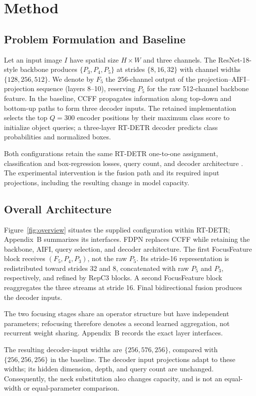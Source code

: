 \documentclass[journal]{IEEEtran}
\begin{document}
\section{Method}
\subsection{Problem Formulation and Baseline}
Let an input image $I$ have spatial size $H\times W$ and three channels. The ResNet-18-style backbone \cite{he2016resnet} produces $\{P_3,P_4,P_5\}$ at strides $\{8,16,32\}$ with channel widths $\{128,256,512\}$. We denote by $F_5$ the 256-channel output of the projection--AIFI--projection sequence (layers 8--10), reserving $P_5$ for the raw 512-channel backbone feature. In the baseline, CCFF propagates information along top-down and bottom-up paths to form three decoder inputs. The retained implementation selects the top $Q=300$ encoder positions by their maximum class score to initialize object queries; a three-layer RT-DETR decoder predicts class probabilities and normalized boxes.

Both configurations retain the same RT-DETR one-to-one assignment, classification and box-regression losses, query count, and decoder architecture \cite{carion2020detr,zhao2024rtdetr}. The experimental intervention is the fusion path and its required input projections, including the resulting change in model capacity.

\subsection{Overall Architecture}
Figure~\ref{fig:overview} situates the supplied configuration within RT-DETR; Appendix~B summarizes its interfaces. FDPN replaces CCFF while retaining the backbone, AIFI, query selection, and decoder architecture. The first FocusFeature block receives $(F_5,P_4,P_3)$, not the raw $P_5$. Its stride-16 representation is redistributed toward strides 32 and 8, concatenated with raw $P_5$ and $P_3$, respectively, and refined by RepC3 blocks. A second FocusFeature block reaggregates the three streams at stride 16. Final bidirectional fusion produces the decoder inputs.

The two focusing stages share an operator structure but have independent parameters; refocusing therefore denotes a second learned aggregation, not recurrent weight sharing. Appendix~B records the exact layer interfaces.

The resulting decoder-input widths are $\{256,576,256\}$, compared with $\{256,256,256\}$ in the baseline. The decoder input projections adapt to these widths; its hidden dimension, depth, and query count are unchanged. Consequently, the neck substitution also changes capacity, and is not an equal-width or equal-parameter comparison.
\end{document}
